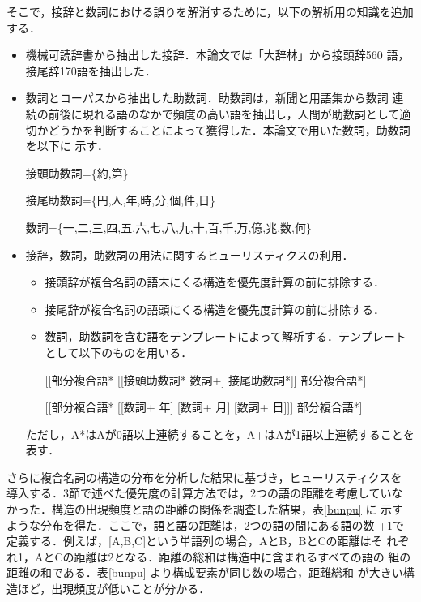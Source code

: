 そこで，接辞と数詞における誤りを解消するために，以下の解析用の知識を追加する．
\begin{itemize}
\item 機械可読辞書から抽出した接辞．本論文では「大辞林」から接頭辞560
語，接尾辞170語を抽出した．
\item 数詞とコーパスから抽出した助数詞．助数詞は，新聞と用語集から数詞
連続の前後に現れる語のなかで頻度の高い語を抽出し，人間が助数詞として適
切かどうかを判断することによって獲得した．本論文で用いた数詞，助数詞を以下に
示す．

接頭助数詞=\{約,第\}

接尾助数詞=\{円,人,年,時,分,個,件,日\}

数詞=\{一,二,三,四,五,六,七,八,九,十,百,千,万,億,兆,数,何\}
  
\item 接辞，数詞，助数詞の用法に関するヒューリスティクスの利用．
  \begin{itemize}
  \item 接頭辞が複合名詞の語末にくる構造を優先度計算の前に排除する．
  \item 接尾辞が複合名詞の語頭にくる構造を優先度計算の前に排除する．
  \item 数詞，助数詞を含む語をテンプレートによって解析する．テンプレート
として以下のものを用いる．

[[部分複合語* [[接頭助数詞* 数詞+] 接尾助数詞*]] 部分複合語*]

[[部分複合語* [[数詞+ 年] [数詞+ 月] [数詞+ 日]]] 部分複合語*]
  \end{itemize}

  ただし，A*はAが0語以上連続することを，A+はAが1語以上連続することを表す．
\end{itemize}

\bigskip

さらに複合名詞の構造の分布を分析した結果に基づき，ヒューリスティクスを
導入する．3節で述べた優先度の計算方法では，2つの語の距離を考慮していな
かった．構造の出現頻度と語の距離の関係を調査した結果，表\ref{bunpu} に
示すような分布を得た．ここで，語と語の距離は，2つの語の間にある語の数
+1で定義する．例えば，[A,B,C]という単語列の場合，AとB，BとCの距離はそ
れぞれ1，AとCの距離は2となる．距離の総和は構造中に含まれるすべての語の
組の距離の和である．表\ref{bunpu} より構成要素が同じ数の場合，距離総和
が大きい構造ほど，出現頻度が低いことが分かる．

